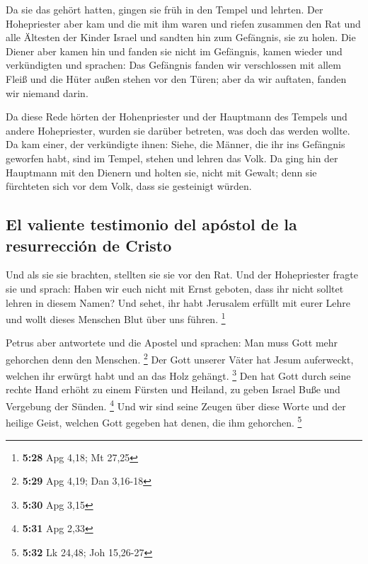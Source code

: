  Da sie das gehört hatten, gingen sie früh in den Tempel
und lehrten. Der Hohepriester aber kam und die mit ihm waren und riefen
zusammen den Rat und alle Ältesten der Kinder Israel und sandten hin zum
Gefängnis, sie zu holen.  Die Diener aber kamen hin und
fanden sie nicht im Gefängnis, kamen wieder und verkündigten
 und sprachen: Das Gefängnis fanden wir verschlossen mit
allem Fleiß und die Hüter außen stehen vor den Türen; aber da wir
auftaten, fanden wir niemand darin.

 Da diese Rede hörten der Hohenpriester und der Hauptmann
des Tempels und andere Hohepriester, wurden sie darüber betreten, was
doch das werden wollte.  Da kam einer, der verkündigte
ihnen: Siehe, die Männer, die ihr ins Gefängnis geworfen habt, sind im
Tempel, stehen und lehren das Volk.  Da ging hin der
Hauptmann mit den Dienern und holten sie, nicht mit Gewalt; denn sie
fürchteten sich vor dem Volk, dass sie gesteinigt würden.

\hypertarget{el-valiente-testimonio-del-apuxf3stol-de-la-resurrecciuxf3n-de-cristo}{%
\subsection{El valiente testimonio del apóstol de la resurrección de
Cristo}\label{el-valiente-testimonio-del-apuxf3stol-de-la-resurrecciuxf3n-de-cristo}}

 Und als sie sie brachten, stellten sie sie vor den Rat.
Und der Hohepriester fragte sie  und sprach: Haben wir
euch nicht mit Ernst geboten, dass ihr nicht solltet lehren in diesem
Namen? Und sehet, ihr habt Jerusalem erfüllt mit eurer Lehre und wollt
dieses Menschen Blut über uns führen. \footnote{\textbf{5:28} Apg 4,18;
  Mt 27,25}

 Petrus aber antwortete und die Apostel und sprachen: Man
muss Gott mehr gehorchen denn den Menschen. \footnote{\textbf{5:29} Apg
  4,19; Dan 3,16-18}  Der Gott unserer Väter hat Jesum
auferweckt, welchen ihr erwürgt habt und an das Holz gehängt.
\footnote{\textbf{5:30} Apg 3,15}  Den hat Gott durch
seine rechte Hand erhöht zu einem Fürsten und Heiland, zu geben Israel
Buße und Vergebung der Sünden. \footnote{\textbf{5:31} Apg 2,33}
 Und wir sind seine Zeugen über diese Worte und der
heilige Geist, welchen Gott gegeben hat denen, die ihm gehorchen.
\footnote{\textbf{5:32} Lk 24,48; Joh 15,26-27}

